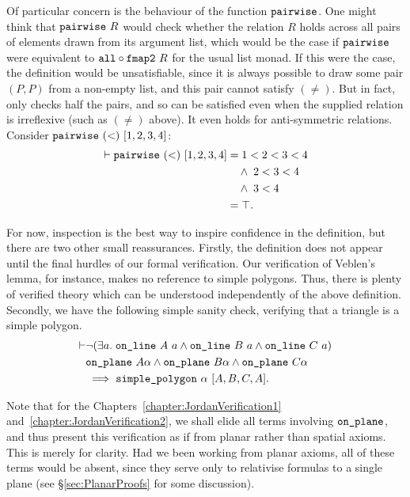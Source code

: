 Of particular concern is the behaviour of the function $\texttt{pairwise}$. One might think that $\texttt{pairwise}\ R$ would check whether the relation $R$ holds across all pairs of elements drawn from its argument list, which would be the case if $\texttt{pairwise}$ were equivalent to $\texttt{all} \circ \texttt{fmap2}\ R$ for the usual list monad. If this were the case, the definition would be unsatisfiable, since it is always possible to draw some pair $(P,P)$ from a non-empty list, and this pair cannot satisfy $(\neq)$. But in fact,  only checks half the pairs, and so can be satisfied even when the supplied relation is irreflexive (such as $(\neq)$ above). It even holds for anti-symmetric relations. Consider $\texttt{pairwise}\ (<)\ [1,2,3,4]$:
\begin{align*}
  \vdash\texttt{pairwise}\ (<)\ [1,2,3,4] &= 1 < 2 < 3 < 4 \\
  &\quad\wedge\; 2 < 3 < 4 \\
  &\quad\wedge\; 3 < 4\\
  & = \top.
\end{align*}

For now, inspection is the best way to inspire confidence in the definition, but there are two other small reassurances. Firstly, the definition does not appear until the final hurdles of our formal verification. Our verification of Veblen's lemma, for instance, makes no reference to simple polygons. Thus, there is plenty of verified theory which can be understood independently of the above definition. Secondly, we have the following simple sanity check, verifying that a triangle is a simple polygon.
\begin{equation*}
  \begin{split}
    \vdash&\neg(\exists a.\; \texttt{on\_line}\ A\ a\wedge \texttt{on\_line}\ B\ a\wedge \texttt{on\_line}\ C\ a)\\
    &\texttt{on\_plane}\ A \alpha\wedge\texttt{on\_plane}\ B \alpha\wedge\texttt{on\_plane}\ C \alpha\\
    &\implies \texttt{simple\_polygon}\ \alpha\ [A,B,C,A].
  \end{split}
\end{equation*}

Note that for the Chapters~\ref{chapter:JordanVerification1} and~\ref{chapter:JordanVerification2}, we shall elide all terms involving $\texttt{on\_plane}$, and thus present this verification as if from planar rather than spatial axioms. This is merely for clarity. Had we been working from planar axioms, all of these terms would be absent, since they serve only to relativise formulas to a single plane (see \S\ref{sec:PlanarProofs} for some discussion).

